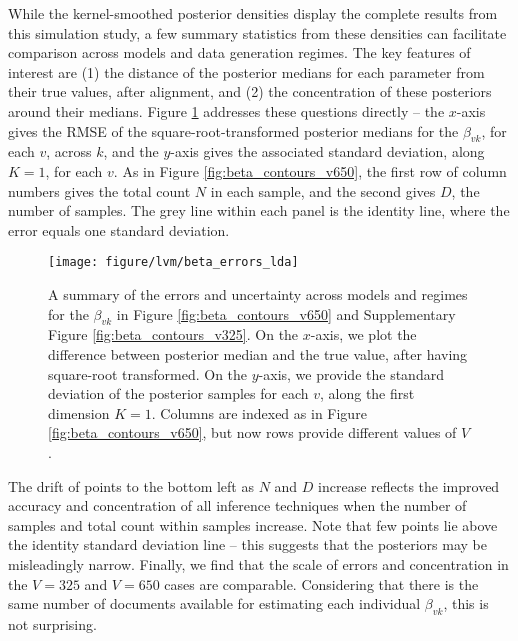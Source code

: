 While the kernel-smoothed posterior densities display the complete results from
this simulation study, a few summary statistics from these densities can
facilitate comparison across models and data generation regimes. The key
features of interest are (1) the distance of the posterior medians for each
parameter from their true values, after alignment, and (2) the concentration of
these posteriors around their medians. Figure \ref{fig:beta_errors_lda}
addresses these questions directly -- the $x$-axis gives the RMSE of the
square-root-transformed posterior medians for the $\beta_{vk}$, for each $v$,
across $k$, and the $y$-axis gives the associated standard deviation, along $K =
1$, for each $v$. As in Figure \ref{fig:beta_contours_v650}, the first row of
column numbers gives the total count $N$ in each sample, and the second gives
$D$, the number of samples. The grey line within each panel is the identity
line, where the error equals one standard deviation.

\begin{figure}
  \centering
  \texttt{[image: figure/lvm/beta\_errors\_lda]}
  \caption{A summary of the errors and uncertainty across models and regimes for
    the $\beta_{vk}$ in Figure \ref{fig:beta_contours_v650} and Supplementary
    Figure \ref{fig:beta_contours_v325}. On the $x$-axis, we plot the difference
    between posterior median and the true value, after having square-root
    transformed. On the $y$-axis, we provide the standard deviation of the
    posterior samples for each $v$, along the first dimension $K = 1$. Columns
    are indexed as in Figure \ref{fig:beta_contours_v650}, but now rows provide
    different values of $V$.
    \label{fig:beta_errors_lda} }
\end{figure}

The drift of points to the bottom left as $N$ and $D$ increase reflects the
improved accuracy and concentration of all inference techniques when the number
of samples and total count within samples increase. Note that few points lie
above the identity standard deviation line -- this suggests that the posteriors
may be misleadingly narrow. Finally, we find that the scale of errors and
concentration in the $V = 325$ and $V = 650$ cases are comparable. Considering
that there is the same number of documents available for estimating each
individual $\beta_{vk}$, this is not surprising.

